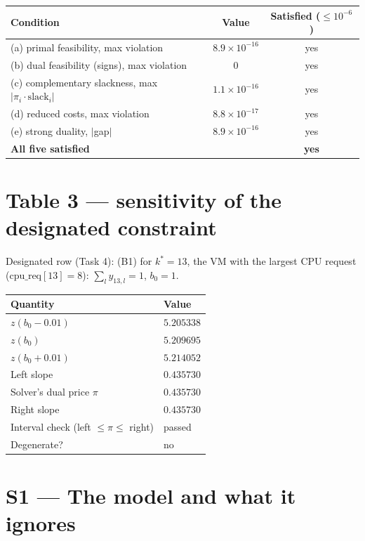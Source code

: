 \documentclass[11pt]{article}
\begin{document}
\begin{center}
\renewcommand{\arraystretch}{1.2}
\begin{tabular}{@{}lcc@{}}
\toprule
Condition & Value & Satisfied ($\le10^{-6}$) \\
\midrule
(a) primal feasibility, max violation & $8.9\times10^{-16}$ & yes \\
(b) dual feasibility (signs), max violation & $0$ & yes \\
(c) complementary slackness, max $|\pi_i\cdot\text{slack}_i|$ & $1.1\times10^{-16}$ & yes \\
(d) reduced costs, max violation & $8.8\times10^{-17}$ & yes \\
(e) strong duality, $|$gap$|$ & $8.9\times10^{-16}$ & yes \\
\midrule
\textbf{All five satisfied} & & \textbf{yes} \\
\bottomrule
\end{tabular}
\end{center}

\section{Table 3 --- sensitivity of the designated constraint}

Designated row (Task 4): (B1) for $k^\ast{=}13$, the VM with the largest CPU request
($\text{cpu\_req}[13]{=}8$): $\sum_l y_{13,l}=1$, $b_0=1$.

\begin{center}
\renewcommand{\arraystretch}{1.2}
\begin{tabular}{@{}ll@{}}
\toprule
Quantity & Value \\
\midrule
$z(b_0-0.01)$ & $5.205338$ \\
$z(b_0)$ & $5.209695$ \\
$z(b_0+0.01)$ & $5.214052$ \\
Left slope & $0.435730$ \\
Solver's dual price $\pi$ & $0.435730$ \\
Right slope & $0.435730$ \\
Interval check (left $\le\pi\le$ right) & passed \\
Degenerate? & no \\
\bottomrule
\end{tabular}
\end{center}

\section{S1 --- The model and what it ignores}
\end{document}
